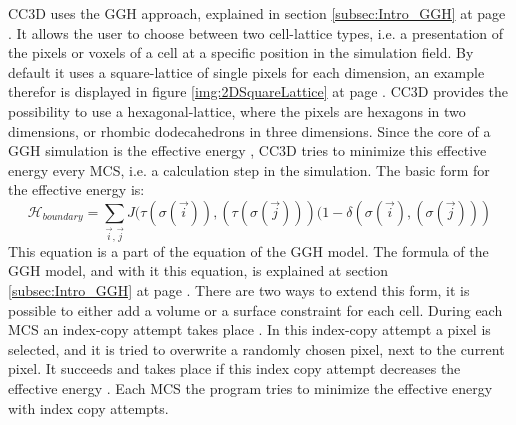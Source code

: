 CC3D uses the \ac{GGH} approach, explained in section \ref{subsec:Intro_GGH} at page \pageref{subsec:Intro_GGH}. It allows the user to choose between two cell-lattice types, i.e. a presentation of the pixels or voxels of a cell at a specific position in the simulation field. By default it uses a square-lattice of single pixels for each dimension, an example therefor is displayed in figure \ref{img:2DSquareLattice} at page \pageref{img:2DSquareLattice}. \ac{CC3D} provides the possibility to use a hexagonal-lattice, where the pixels are hexagons in two dimensions, or rhombic dodecahedrons in three dimensions.
Since the core of a \ac{GGH} simulation is the effective energy \cite{MaciejH.Swat2017}, \ac{CC3D} tries to minimize this effective energy every \ac{MCS}, i.e. a calculation step in the simulation. The basic form for the effective energy is:
\begin{equation}
\mathcal{H}_{boundary} = \sum_{\vec{i},\vec{j}}^{ }{J(\tau(\sigma(\vec{i})),(\tau(\sigma(\vec{j})))(1-\delta(\sigma(\vec{i}),(\sigma(\vec{j})))}
\end{equation}
This equation is a part of the equation of the \ac{GGH} model. The formula of the \ac{GGH} model, and with it this equation, is explained at section \ref{subsec:Intro_GGH} at page \pageref{subsec:Intro_GGH}. \newline
There are two ways to extend this form, it is possible to either add a volume or a surface constraint for each cell. During each \ac{MCS} an index-copy attempt takes place \cite{MaciejH.Swat2017}. In this index-copy attempt a pixel is selected, and it is tried to overwrite a randomly chosen pixel, next to the current pixel. It succeeds and takes place if this index copy attempt decreases the effective energy \cite{MaciejH.Swat2017}. Each \ac{MCS} the program tries to minimize the effective energy with index copy attempts.


